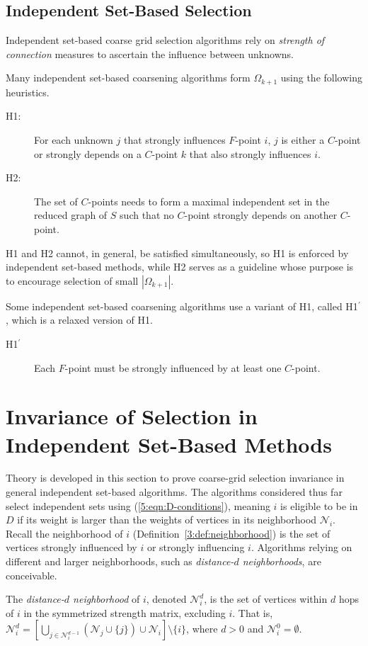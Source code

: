 \documentclass{elsart}
\newcommand{\hp}{H1$^\prime$}
\begin{document}
\subsection{Independent Set-Based Selection}
\label{sec:indep-set-based}
Independent set-based coarse grid selection algorithms rely on
\emph{strength of connection} measures to ascertain the influence
between unknowns.

Many independent set-based coarsening algorithms form $\Omega_{k+1}$
using the following heuristics.
\begin{description}
\item[H1:] For each unknown $j$ that strongly influences $F$-point
  $i$, $j$ is either a $C$-point or strongly depends on a $C$-point
  $k$ that also strongly influences $i$.
\item[H2:] The set of $C$-points needs to form a maximal independent
  set in the reduced graph of $S$ such that no $C$-point strongly
  depends on another $C$-point.
\end{description}
H1 and H2 cannot, in general, be satisfied simultaneously, so H1 is
enforced by independent set-based methods, while H2 serves as a
guideline whose purpose is to encourage selection of small
$|\Omega_{k+1}|$.

Some independent set-based coarsening algorithms use a variant of H1,
called \hp, which is a relaxed version of H1.
\begin{description}
\item[\hp] Each $F$-point must be strongly influenced by at least one
  $C$-point.
\end{description}

\section{Invariance of Selection in Independent Set-Based Methods}
\label{sec:invariance}

Theory is developed in this section to prove coarse-grid selection
invariance in general independent set-based algorithms. The algorithms
considered thus far select independent sets using
(\ref{5:eqn:D-conditions}), meaning $i$ is eligible to be in $D$ if
its weight is larger than the weights of vertices in its neighborhood
$\mathcal{N}_i$. Recall the neighborhood of $i$
(Definition~\ref{3:def:neighborhood}) is the set of vertices strongly
influenced by $i$ or strongly influencing $i$. Algorithms relying on
different and larger neighborhoods, such as \emph{distance-$d$
neighborhoods}, are conceivable.
\begin{defn}
The \emph{distance-$d$ neighborhood} of $i$, denoted
$\mathcal{N}_i^d$, is the set of vertices within $d$ hops of $i$ in
the symmetrized strength matrix, excluding $i$. That is,
$\mathcal{N}_i^d = \left[\bigcup_{j \in
\mathcal{N}_i^{d-1}}\left(\mathcal{N}_j \cup \{j\}\right)\cup
\mathcal{N}_i\right] \setminus \{i\}$, where $d > 0$ and
$\mathcal{N}_i^0 = \emptyset$.
\end{defn}
\end{document}
